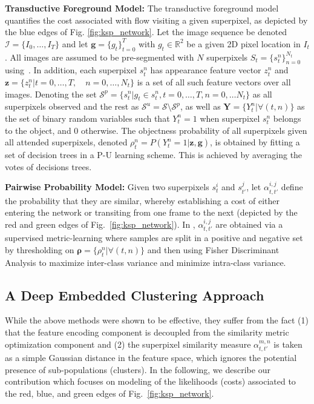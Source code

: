 \textbf{Transductive Foreground Model: }
The transductive foreground model quantifies the cost associated with flow visiting a given superpixel, as depicted by the blue edges of Fig. \ref{fig:ksp_network}. Let the image sequence be denoted $\mathcal{I} = \{I_0,\ldots,I_T\}$ and let $\bm{g} = \{g_t\}_{t=0}^T$ with $g_t\in\mathbb{R}^2$ be a given 2D pixel location in $I_t$.
All images are assumed to be pre-segmented with $N$ superpixels $S_t=\{s^n_t\}_{n=0}^{N_t}$ using~\cite{achanta12}.
In addition, each superpixel $s_t^n$ has appearance feature vector $z_t^n$ and $\bm{z}=\{z_t^n | t=0,\ldots,T,\quad n=0,\ldots,N_t\}$ is a set of all such feature vectors over all images.
Denoting the set $\mathcal{S}^p = \{s^n_t | g_t \in s^n_t, t=0,\ldots,T,n=0,\ldots N_t \}$ as all superpixels observed and the rest as $\mathcal{S}^u = \mathcal{S} \setminus \mathcal{S}^p$, as well as $\bm{Y} = \{Y_t^n|\forall(t,n)\}$ as the set of binary random variables such that $Y_t^n=1$ when superpixel $s_t^n$ belongs to the object, and $0$ otherwise. The objectness probability of all superpixels given all attended superpixels, denoted $\rho_{t}^n = P(Y_t^n = 1 | \bm{z}, \bm{g})$, is obtained by fitting a set of decision trees in a P-U learning scheme. This is achieved by averaging the votes of decisions trees.

\textbf{Pairwise Probability Model: }
Given two superpixels $s_t^i$ and $s_{t'}^j$, let $\alpha_{t,t'}^{i,j}$ define the probability that they are similar, whereby establishing a cost of either entering the network or transiting from one frame to the next (\ie depicted by the red and green edges of Fig.~\ref{fig:ksp_network}). In \cite{lejeune18}, $\alpha_{t,t'}^{i,j}$ are obtained via a supervised metric-learning where samples are split in a positive and negative set by thresholding on $\bm{\rho} = \{ \rho_t^n | \forall(t,n)\}$
 and then using Fisher Discriminant Analysis \cite{welling05} to maximize inter-class variance and minimize intra-class variance.

\subsection{A Deep Embedded Clustering Approach}
\label{sec:dec}
While the above methods were shown to be effective, they suffer from the fact (1) that the feature encoding component is decoupled from the similarity metric optimization component and (2) the superpixel similarity measure $\alpha_{t,t'}^{m,n}$ is taken as a simple Gaussian distance in the feature space, which ignores the potential presence of sub-populations (clusters). In the following, we describe our contribution which focuses on modeling of the likelihoods (costs) associated to the red, blue, and green edges of Fig.~\ref{fig:ksp_network}.

